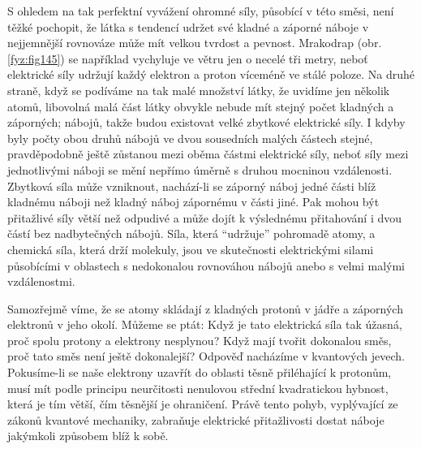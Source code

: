     S ohledem na tak perfektní vyvážení ohromné síly, působící v této směsi, není těžké pochopit, že
    látka s tendencí udržet své kladné a záporné náboje v nejjemnější rovnováze může mít velkou
    tvrdost a pevnost. Mrakodrap \wikiELB (obr. \ref{fyz:fig145}) se například vychyluje ve větru
    jen o necelé tři metry, neboť elektrické síly udržují každý elektron a proton víceméně ve stálé
    poloze. Na druhé straně, když se podíváme na tak malé množství látky, že uvidíme jen několik
    atomů, libovolná malá část látky obvykle nebude mít stejný počet kladných a záporných; nábojů,
    takže budou existovat velké zbytkové elektrické síly. I kdyby byly počty obou druhů nábojů ve
    dvou sousedních malých částech stejné, pravděpodobně ještě zůstanou mezi oběma částmi elektrické
    síly, neboť síly mezi jednotlivými náboji se mění nepřímo úměrně s druhou mocninou vzdálenosti.
    Zbytková síla může vzniknout, nachází-li se záporný náboj jedné části blíž kladnému náboji než
    kladný náboj zápornému v části jiné. Pak mohou být přitažlivé síly větší než odpudivé a může
    dojít k výslednému přitahování i dvou částí bez nadbytečných nábojů. Síla, která “udržuje”
    pohromadě atomy, a chemická síla, která drží molekuly, jsou ve skutečnosti elektrickými silami
    působícími v oblastech s nedokonalou rovnováhou nábojů anebo s velmi malými vzdálenostmi.

    Samozřejmě víme, že se atomy skládají z kladných protonů v jádře a záporných elektronů v jeho 
    okolí. Můžeme se ptát: Když je tato elektrická síla tak úžasná, proč spolu protony a elektrony 
    nesplynou? Když mají tvořit dokonalou směs, proč tato směs není ještě dokonalejší? Odpověď 
    nacházíme v kvantových jevech. Pokusíme-li se naše elektrony uzavřít do oblasti těsně 
    přiléhající k protonům, musí mít podle principu neurčitosti nenulovou střední kvadratickou 
    hybnost, která je tím větší, čím těsnější je ohraničení. Právě tento pohyb, vyplývající ze 
    zákonů kvantové mechaniky, zabraňuje elektrické přitažlivosti dostat náboje jakýmkoli způsobem 
    blíž k sobě.
    
